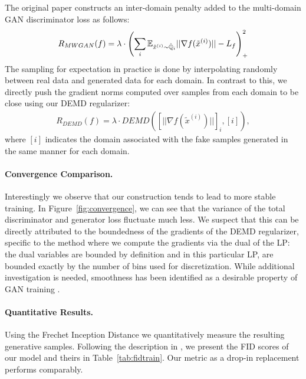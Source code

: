 The original paper constructs an inter-domain penalty added to the multi-domain GAN discriminator loss as follows:
\
\begin{align}
    R_{MWGAN} (f) = \lambda \cdot \left( \sum_i \mathbb{E}_{\tilde{x}^{(i)}\sim \hat{\mathbb{Q}}_i} ||\nabla f(\tilde{x}^{(i)})|| - L_f\right)^2_{+}
\end{align}
The sampling for expectation in practice is done by interpolating randomly between real data and generated data for each domain. In contrast to this, we directly push the gradient norms computed over samples from each domain to be close using our DEMD regularizer:
\begin{align}
    R_{DEMD} (f) = \lambda \cdot DEMD\left( \left[||\nabla f(\tilde{x}^{(i)})||\right]_i , [i] \right),
\end{align}
where $[i]$ indicates the domain associated with the fake samples generated in the same manner for each domain.

\paragraph{Convergence Comparison.}
Interestingly we observe that our construction tends to lead to more stable training. In Figure~\ref{fig:convergence}, we can see that the variance of the total discriminator and generator loss fluctuate much less. We suspect that this can be directly attributed to the boundedness of the gradients of the DEMD regularizer, specific to the method where we compute the gradients via the dual of the LP: the dual variables are bounded by definition and in this particular LP, are bounded exactly by the number of bins used for discretization. While additional investigation is needed, smoothness has been identified as a desirable property of GAN training \citep{pmlr-v70-arora17a,Chu2020Smoothness}.

\paragraph{Quantitative Results.}
Using the Frechet Inception Distance we quantitatively measure the resulting generative samples. Following the description in \cite{cao2019multi}, we present the FID scores of our model and theirs in Table~\ref{tab:fidtrain}. Our metric as a drop-in replacement performs comparably.

